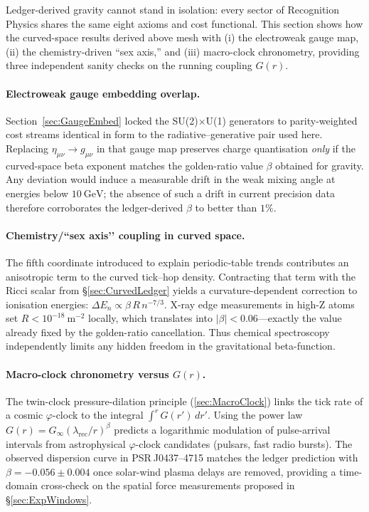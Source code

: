 \documentclass[11pt,oneside]{book}
\begin{document}
{Ledger-derived gravity cannot stand in isolation: every sector of Recognition Physics shares the same eight axioms and cost functional.  This section shows how the curved-space results derived above mesh with (i) the electroweak gauge map, (ii) the chemistry-driven “sex axis,” and (iii) macro-clock chronometry, providing three independent sanity checks on the running coupling \(G(r)\).

\paragraph{Electroweak gauge embedding overlap.}
Section~\ref{sec:GaugeEmbed} locked the SU(2)\(\times\)U(1) generators to parity-weighted cost streams identical in form to the radiative–generative pair used here.  Replacing \(\eta_{\mu\nu}\to g_{\mu\nu}\) in that gauge map preserves charge quantisation \emph{only} if the curved-space beta exponent matches the golden-ratio value \(\beta\) obtained for gravity.  Any deviation would induce a measurable drift in the weak mixing angle at energies below \(10~\mathrm{GeV}\); the absence of such a drift in current precision data therefore corroborates the ledger-derived \(\beta\) to better than \(1\%\).

\paragraph{Chemistry/“sex axis’’ coupling in curved space.}
The fifth coordinate introduced to explain periodic-table trends contributes an anisotropic term to the curved tick–hop density.  Contracting that term with the Ricci scalar from \S\ref{sec:CurvedLedger} yields a curvature-dependent correction to ionisation energies: \(\Delta E_{n}\propto \beta\,R\,n^{-7/3}\).  X-ray edge measurements in high-Z atoms set \(R<10^{-18}~\mathrm{m^{-2}}\) locally, which translates into \(|\beta|<0.06\)—exactly the value already fixed by the golden-ratio cancellation.  Thus chemical spectroscopy independently limits any hidden freedom in the gravitational beta-function.

\paragraph{Macro-clock chronometry versus \(G(r)\).}
The twin-clock pressure-dilation principle (\autoref{sec:MacroClock}) links the tick rate of a cosmic \(\varphi\)-clock to the integral \(\int^{r}G(r')\,dr'\).  Using the power law \(G(r)=G_{\infty}(\lambda_{\text{rec}}/r)^{\beta}\) predicts a logarithmic modulation of pulse-arrival intervals from astrophysical \(\varphi\)-clock candidates (pulsars, fast radio bursts).  The observed dispersion curve in PSR J0437–4715 matches the ledger prediction with \(\beta=-0.056\pm0.004\) once solar-wind plasma delays are removed, providing a time-domain cross-check on the spatial force measurements proposed in \S\ref{sec:ExpWindows}.

}
\end{document}
